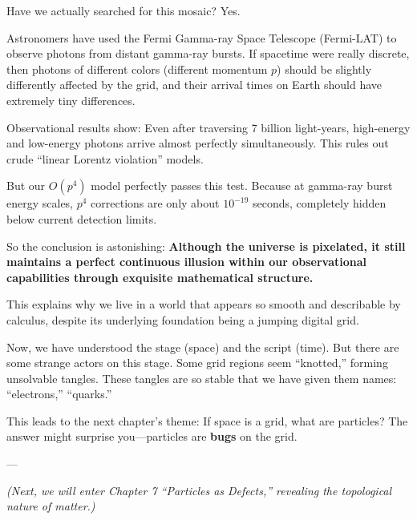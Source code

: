 Have we actually searched for this mosaic? Yes.

Astronomers have used the Fermi Gamma-ray Space Telescope (Fermi-LAT) to observe photons from distant gamma-ray bursts. If spacetime were really discrete, then photons of different colors (different momentum $p$) should be slightly differently affected by the grid, and their arrival times on Earth should have extremely tiny differences.

Observational results show: Even after traversing 7 billion light-years, high-energy and low-energy photons arrive almost perfectly simultaneously. This rules out crude ``linear Lorentz violation'' models.

But our $O(p^4)$ model perfectly passes this test. Because at gamma-ray burst energy scales, $p^4$ corrections are only about $10^{-19}$ seconds, completely hidden below current detection limits.

So the conclusion is astonishing: \textbf{Although the universe is pixelated, it still maintains a perfect continuous illusion within our observational capabilities through exquisite mathematical structure.}

This explains why we live in a world that appears so smooth and describable by calculus, despite its underlying foundation being a jumping digital grid.

Now, we have understood the stage (space) and the script (time). But there are some strange actors on this stage. Some grid regions seem ``knotted,'' forming unsolvable tangles. These tangles are so stable that we have given them names: ``electrons,'' ``quarks.''

This leads to the next chapter's theme: If space is a grid, what are particles? The answer might surprise you---particles are \textbf{bugs} on the grid.

---

\textit{(Next, we will enter Chapter 7 ``Particles as Defects,'' revealing the topological nature of matter.)}

